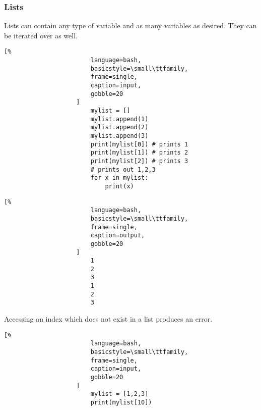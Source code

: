 \documentclass[crop=false,class=book,oneside]{standalone}
\begin{document}
            \subsubsection{Lists}
                Lists can contain any type of variable and as many
                variables as desired. They can be iterated over as
                well.\newline
                \begin{minipage}[t]{.48\textwidth}
                    \centering
                    \begin{lstlisting}[%
                        language=bash,
                        basicstyle=\small\ttfamily,
                        frame=single,
                        caption=input,
                        gobble=20
                    ]
                        mylist = []
                        mylist.append(1)
                        mylist.append(2)
                        mylist.append(3)
                        print(mylist[0]) # prints 1
                        print(mylist[1]) # prints 2
                        print(mylist[2]) # prints 3
                        # prints out 1,2,3
                        for x in mylist:
                            print(x)
                    \end{lstlisting}
                \end{minipage}\hfill
                \begin{minipage}[t]{.48\textwidth}
                    \centering
                    \begin{lstlisting}[%
                        language=bash,
                        basicstyle=\small\ttfamily,
                        frame=single,
                        caption=output,
                        gobble=20
                    ]
                        1
                        2
                        3
                        1
                        2
                        3
                    \end{lstlisting}
                \end{minipage}
                Accessing an index which does not exist in a
                list produces an error.\newline
                \begin{minipage}[t]{.48\textwidth}
                    \centering
                    \begin{lstlisting}[%
                        language=bash,
                        basicstyle=\small\ttfamily,
                        frame=single,
                        caption=input,
                        gobble=20
                    ]
                        mylist = [1,2,3]
                        print(mylist[10])
                    \end{lstlisting}
                \end{minipage}\hfill
\end{document}
